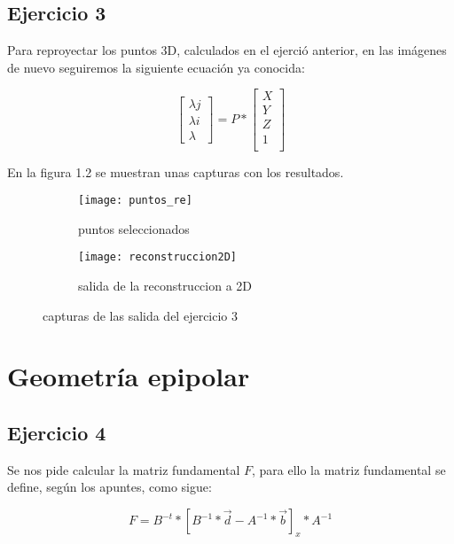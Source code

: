\documentclass[paper=a4, fontsize=11pt]{scrartcl} %
\numberwithin{equation}{section} %
\numberwithin{figure}{section} %
\numberwithin{table}{section} %
\begin{document}
\subsection{Ejercicio 3}
Para reproyectar los puntos 3D, calculados en el ejerció anterior, en las imágenes de nuevo seguiremos la siguiente ecuación ya conocida:

\begin{equation}
\begin{bmatrix}
 	\lambda j\\
 	\lambda i\\
	\lambda
\end{bmatrix}
=
P
*
\begin{bmatrix}
 	X\\
 	Y\\
 	Z\\
 	1\\
\end{bmatrix}
\end{equation} 

En la figura 1.2 se muestran unas capturas con los resultados.\\

\begin{figure}
\begin{subfigure}{.5\textwidth}
  \centering
  \texttt{[image: puntos\_re]}
  \caption{puntos seleccionados}
  \label{fig:sfig1}
\end{subfigure}%
\begin{subfigure}{.5\textwidth}
  \centering
  \texttt{[image: reconstruccion2D]}
  \caption{salida de la reconstruccion a 2D}
  \label{fig:sfig2}
\end{subfigure}
\caption{capturas de las salida del ejercicio 3}
\label{fig:fig}
\end{figure}  

\clearpage

\section{Geometría epipolar}
\subsection{Ejercicio 4}

Se nos pide calcular la matriz fundamental $F$, para ello la matriz fundamental se define, según los apuntes, como sigue:

\begin{equation}
	F = B^{-t} * [B^{-1}*\vec{d} - A^{-1}*\vec{b}]_{x} * A^{-1}
\end{equation}
\end{document}
